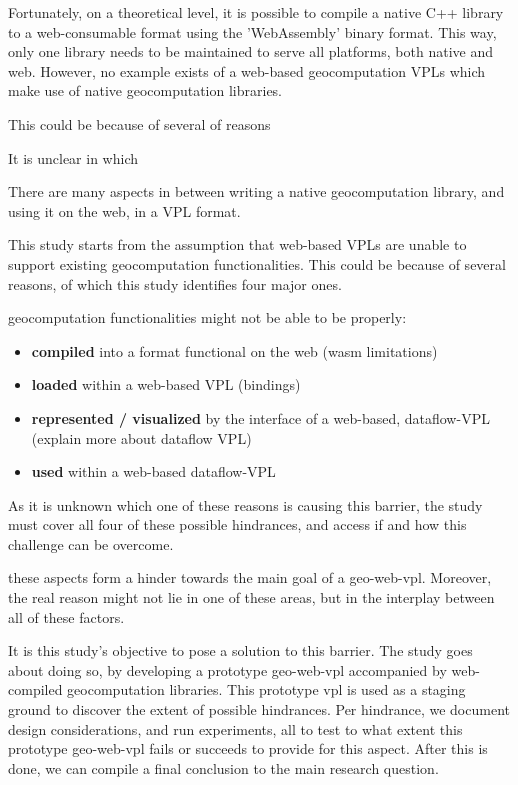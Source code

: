 Fortunately, on a theoretical level, it is possible to compile a native C++ library to a web-consumable format using the 'WebAssembly' binary format.
This way, only one library needs to be maintained to serve all platforms, both native and web. 
However, no example exists of a web-based geocomputation VPLs which make use of native geocomputation libraries.

This could be because of several of reasons

It is unclear in which 

There are many aspects in between writing a native geocomputation library, and using it on the web, in a VPL format. 


This study starts from the assumption that web-based VPLs are unable to support existing geocomputation functionalities. 
This could be because of several reasons, of which this study identifies four major ones.

geocomputation functionalities might not be able to be properly:
\begin{itemize}[-]
  \item \textbf{compiled} into a format functional on the web (wasm limitations)
  \item \textbf{loaded} within a web-based VPL (bindings)
  \item \textbf{represented / visualized} by the interface of a web-based, dataflow-VPL (explain more about dataflow VPL)
  \item \textbf{used} within a web-based dataflow-VPL
\end{itemize}

As it is unknown which one of these reasons is causing this barrier, the study must cover all four of these possible hindrances, and access if and how this challenge can be overcome. 


these aspects form a hinder towards the main goal of a \ac{geo-web-vpl}. 
Moreover, the real reason might not lie in one of these areas, but in the interplay between all of these factors. 

It is this study's objective to pose a solution to this barrier. 
The study goes about doing so, by developing a prototype \ac{geo-web-vpl} accompanied by web-compiled geocomputation libraries. 
This prototype vpl is used as a staging ground to discover the extent of possible hindrances. 
Per hindrance, we document design considerations, and run experiments, all to test to what extent this prototype \ac{geo-web-vpl} fails or succeeds to provide for this aspect. 
After this is done, we can compile a final conclusion to the main research question. 



